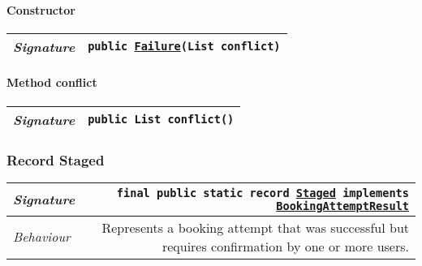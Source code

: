 \begin{adjustwidth}{1.5em}{0pt}
\begin{adjustwidth}{1.5em}{0pt}
\begin{adjustwidth}{1.5em}{0pt}
{\begin{tabularx}{1.0\linewidth}{@{}l R@{}}
      \end{tabularx}}\paragraph{Constructor\label{edu.kit.hci.soli.dto.BookingAttemptResult.Failure@edu.kit.hci.soli.dto.BookingAttemptResult.Failure(java.util.List)}}
      \begin{adjustwidth}{1.5em}{0pt}
        {\begin{tabularx}{1.0\linewidth}{@{}l R@{}}
          \emph{Signature} & \texttt{public \texttt{\hyperref[edu.kit.hci.soli.dto.BookingAttemptResult.Failure]{\texttt{Failure}}}(\texttt{List} conflict)} \\
          \hline
  
        \end{tabularx}}
      \end{adjustwidth}\paragraph{Method conflict\label{edu.kit.hci.soli.dto.BookingAttemptResult.Failure@conflict()}}
      \begin{adjustwidth}{1.5em}{0pt}
        {\begin{tabularx}{1.0\linewidth}{@{}l R@{}}
          \emph{Signature} & \texttt{public \texttt{List} conflict()} \\
          \hline
  
        \end{tabularx}}
      \end{adjustwidth}
    \end{adjustwidth}\subsubsection{Record Staged\label{edu.kit.hci.soli.dto.BookingAttemptResult.Staged} }
    \begin{adjustwidth}{1.5em}{0pt}
      {\begin{tabularx}{1.0\linewidth}{@{}l R@{}}
        \emph{Signature} & \texttt{final public static  record \texttt{\hyperref[edu.kit.hci.soli.dto.BookingAttemptResult.Staged]{\texttt{Staged}} implements \texttt{\hyperref[edu.kit.hci.soli.dto.BookingAttemptResult]{\texttt{BookingAttemptResult}}}}} \\
        \hline
        \emph{Behaviour} & Represents a booking attempt that was successful but requires confirmation by one or more users.  \\
        \hline
  

\end{tabularx}}
\end{adjustwidth}
\end{adjustwidth}
\end{adjustwidth}
